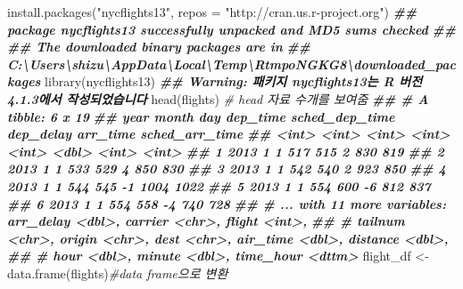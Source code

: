 \documentclass[
]{book}
\newenvironment{Shaded}{\begin{snugshade}}{\end{snugshade}}
\newcommand{\AttributeTok}[1]{\textcolor[rgb]{0.77,0.63,0.00}{#1}}
\newcommand{\CommentTok}[1]{\textcolor[rgb]{0.56,0.35,0.01}{\textit{#1}}}
\newcommand{\DocumentationTok}[1]{\textcolor[rgb]{0.56,0.35,0.01}{\textbf{\textit{#1}}}}
\newcommand{\FunctionTok}[1]{\textcolor[rgb]{0.00,0.00,0.00}{#1}}
\newcommand{\NormalTok}[1]{#1}
\newcommand{\OtherTok}[1]{\textcolor[rgb]{0.56,0.35,0.01}{#1}}
\newcommand{\StringTok}[1]{\textcolor[rgb]{0.31,0.60,0.02}{#1}}
\theoremstyle{definition}
\theoremstyle{definition}
\theoremstyle{definition}
\theoremstyle{definition}
\theoremstyle{remark}
\begin{document}
\begin{Shaded}
\begin{Highlighting}[]
\FunctionTok{install.packages}\NormalTok{(}\StringTok{"nycflights13"}\NormalTok{, }\AttributeTok{repos =} \StringTok{"http://cran.us.r{-}project.org"}\NormalTok{)}
\DocumentationTok{\#\# package \textquotesingle{}nycflights13\textquotesingle{} successfully unpacked and MD5 sums checked}
\DocumentationTok{\#\# }
\DocumentationTok{\#\# The downloaded binary packages are in}
\DocumentationTok{\#\#  C:\textbackslash{}Users\textbackslash{}shizu\textbackslash{}AppData\textbackslash{}Local\textbackslash{}Temp\textbackslash{}RtmpoNGKG8\textbackslash{}downloaded\_packages}
\FunctionTok{library}\NormalTok{(nycflights13)}
\DocumentationTok{\#\# Warning: 패키지 \textquotesingle{}nycflights13\textquotesingle{}는 R 버전 4.1.3에서 작성되었습니다}
\FunctionTok{head}\NormalTok{(flights) }\CommentTok{\# head 자료 수개를 보여줌}
\DocumentationTok{\#\# \# A tibble: 6 x 19}
\DocumentationTok{\#\#    year month   day dep\_time sched\_dep\_time dep\_delay arr\_time sched\_arr\_time}
\DocumentationTok{\#\#   \textless{}int\textgreater{} \textless{}int\textgreater{} \textless{}int\textgreater{}    \textless{}int\textgreater{}          \textless{}int\textgreater{}     \textless{}dbl\textgreater{}    \textless{}int\textgreater{}          \textless{}int\textgreater{}}
\DocumentationTok{\#\# 1  2013     1     1      517            515         2      830            819}
\DocumentationTok{\#\# 2  2013     1     1      533            529         4      850            830}
\DocumentationTok{\#\# 3  2013     1     1      542            540         2      923            850}
\DocumentationTok{\#\# 4  2013     1     1      544            545        {-}1     1004           1022}
\DocumentationTok{\#\# 5  2013     1     1      554            600        {-}6      812            837}
\DocumentationTok{\#\# 6  2013     1     1      554            558        {-}4      740            728}
\DocumentationTok{\#\# \# ... with 11 more variables: arr\_delay \textless{}dbl\textgreater{}, carrier \textless{}chr\textgreater{}, flight \textless{}int\textgreater{},}
\DocumentationTok{\#\# \#   tailnum \textless{}chr\textgreater{}, origin \textless{}chr\textgreater{}, dest \textless{}chr\textgreater{}, air\_time \textless{}dbl\textgreater{}, distance \textless{}dbl\textgreater{},}
\DocumentationTok{\#\# \#   hour \textless{}dbl\textgreater{}, minute \textless{}dbl\textgreater{}, time\_hour \textless{}dttm\textgreater{}}
\NormalTok{flight\_df }\OtherTok{\textless{}{-}}\FunctionTok{data.frame}\NormalTok{(flights)}\CommentTok{\#data frame으로 변환}

\end{Highlighting}
\end{Shaded}
\end{document}
